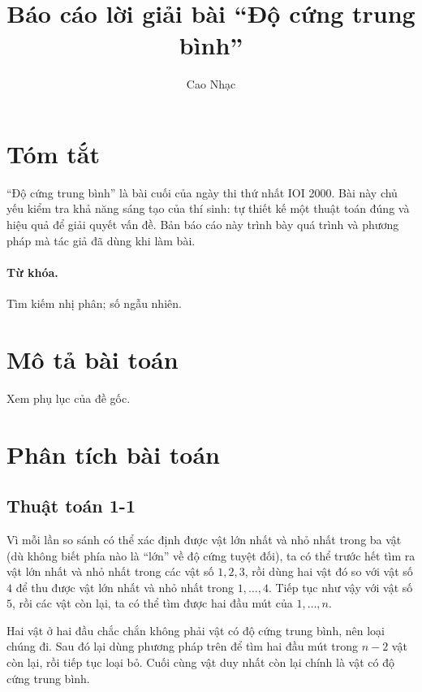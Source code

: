 \documentclass[11pt]{article}
\title{Báo cáo lời giải bài ``Độ cứng trung bình''}
\author{Cao Nhạc}
\date{}
\begin{document}
\maketitle


\section*{Tóm tắt}

``Độ cứng trung bình'' là bài cuối của ngày thi thứ nhất IOI 2000. Bài này
chủ yếu kiểm tra khả năng sáng tạo của thí sinh: tự thiết kế một thuật toán
đúng và hiệu quả để giải quyết vấn đề. Bản báo cáo này trình bày quá trình và
phương pháp mà tác giả đã dùng khi làm bài.

\paragraph{Từ khóa.}
Tìm kiếm nhị phân; số ngẫu nhiên.

\section{Mô tả bài toán}

Xem phụ lục của đề gốc.

\section{Phân tích bài toán}

\subsection{Thuật toán 1-1}

Vì mỗi lần so sánh có thể xác định được vật lớn nhất và nhỏ nhất trong ba vật
(dù không biết phía nào là ``lớn'' về độ cứng tuyệt đối), ta có thể trước hết
tìm ra vật lớn nhất và nhỏ nhất trong các vật số $1,2,3$, rồi dùng hai vật đó
so với vật số $4$ để thu được vật lớn nhất và nhỏ nhất trong $1,\ldots,4$.
Tiếp tục như vậy với vật số $5$, rồi các vật còn lại, ta có thể tìm được hai
đầu mút của $1,\ldots,n$.

Hai vật ở hai đầu chắc chắn không phải vật có độ cứng trung bình, nên loại
chúng đi. Sau đó lại dùng phương pháp trên để tìm hai đầu mút trong $n-2$ vật
còn lại, rồi tiếp tục loại bỏ. Cuối cùng vật duy nhất còn lại chính là vật có
độ cứng trung bình.
\end{document}
